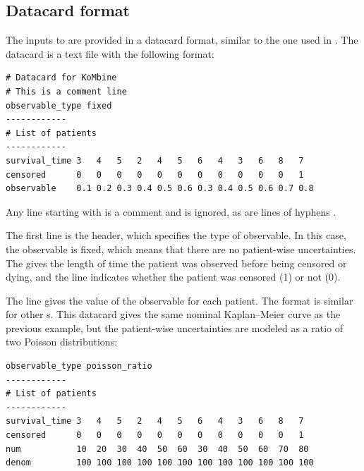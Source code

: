 \documentclass[article]{jss}
\newcommand{\KM}{Kaplan--Meier} %
\begin{document}




\newpage

\begin{appendix}

\section{Datacard format}\label{app:datacard}

The inputs to  are provided in a datacard format, similar to the one used in  \citep{CAT-23-001}.  The datacard is a text file with the following format:
\begin{verbatim}
# Datacard for KoMbine
# This is a comment line
observable_type fixed
------------
# List of patients
------------
survival_time 3   4   5   2   4   5   6   4   3   6   8   7
censored      0   0   0   0   0   0   0   0   0   0   0   1
observable    0.1 0.2 0.3 0.4 0.5 0.6 0.3 0.4 0.5 0.6 0.7 0.8
\end{verbatim}
\end{appendix}
Any line starting with \code{\#} is a comment and is ignored, as are lines of hyphens \code{------------}.

The first line is the header, which specifies the type of observable.  In this case, the observable is fixed, which means that there are no patient-wise uncertainties.  The  gives the length of time the patient was observed before being censored or dying, and the  line indicates whether the patient was censored (1) or not (0).

The  line gives the value of the observable for each patient.  The format is similar for other s.  This datacard gives the same nominal \KM{} curve as the previous example, but the patient-wise uncertainties are modeled as a ratio of two Poisson distributions:
\begin{verbatim}
observable_type poisson_ratio
------------
# List of patients
------------
survival_time 3   4   5   2   4   5   6   4   3   6   8   7
censored      0   0   0   0   0   0   0   0   0   0   0   1
num           10  20  30  40  50  60  30  40  50  60  70  80
denom         100 100 100 100 100 100 100 100 100 100 100 100
\end{verbatim}
\end{document}
